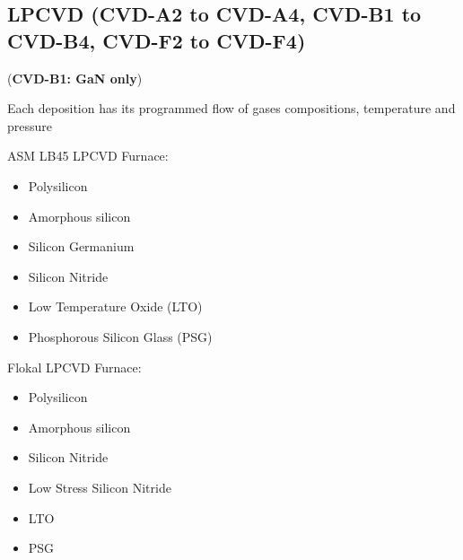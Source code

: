 \subsection{LPCVD (CVD-A2 to CVD-A4, CVD-B1 to CVD-B4, CVD-F2 to CVD-F4)}\label{lpcvd_machine}
\WaferClean\WaferSemiClean (\textbf{CVD-B1: GaN only})

Each deposition has its programmed flow of gases compositions, temperature and pressure

\begin{mdframed}
ASM LB45  LPCVD Furnace:
\begin{itemize}
	\item Polysilicon
	\item Amorphous silicon
	\item Silicon Germanium
	\item Silicon Nitride
	\item Low Temperature Oxide (LTO)
	\item Phosphorous Silicon Glass (PSG)
\end{itemize}
\end{mdframed}\begin{mdframed}
Flokal LPCVD Furnace:
\begin{itemize}
	\item Polysilicon
	\item Amorphous silicon
	\item Silicon Nitride
	\item Low Stress Silicon Nitride
	\item LTO
	\item PSG
\end{itemize}
\end{mdframed}